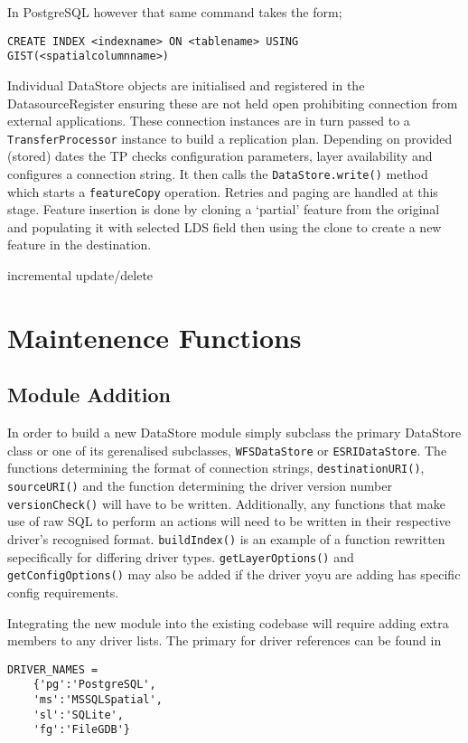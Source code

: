 \documentclass[a4paper]{report}
\begin{document}
In PostgreSQL however that same command takes the form;

 \begin{lstlisting}
CREATE INDEX <indexname> ON <tablename> USING GIST(<spatialcolumnname>)
\end{lstlisting}

Individual DataStore objects are initialised and registered in the
DatasourceRegister ensuring these are not held open prohibiting connection from
external applications. These connection instances are in turn passed to a
\lstinline|TransferProcessor| instance to build a replication plan. Depending on
provided (stored) dates the TP checks configuration parameters, layer
availability and configures a connection string. It then calls the 
\lstinline|DataStore.write()| method which starts a \lstinline|featureCopy|
operation. Retries and paging are handled at this stage.
Feature insertion is done by cloning a `partial' feature from the original and
populating it with selected LDS field then using the clone to create a new
feature in the destination.

incremental update/delete

\section*{Maintenence Functions}

\subsection*{Module Addition}
In order to build a new DataStore module simply subclass the primary DataStore
class or one of its gerenalised subclasses, \lstinline|WFSDataStore| or
\lstinline|ESRIDataStore|. The functions determining the format of connection
strings, \lstinline|destinationURI()|, \lstinline|sourceURI()| and the function
determining the driver version number \lstinline|versionCheck()| will have to be written. 
Additionally, any functions that make use of raw SQL
to perform an actions will need to be written in their respective driver's
recognised format. \lstinline|buildIndex()| is an example of a function
rewritten sepecifically for differing driver types.
\lstinline|getLayerOptions()| and \lstinline|getConfigOptions()| may also be
added if the driver yoyu are adding has specific config requirements.

Integrating the new module into the existing codebase will require adding extra
members to any driver lists. The primary for driver references can be found in 
\begin{lstlisting}
DRIVER_NAMES =
	{'pg':'PostgreSQL',
	'ms':'MSSQLSpatial',
	'sl':'SQLite',
	'fg':'FileGDB'}
\end{lstlisting}
\end{document}
